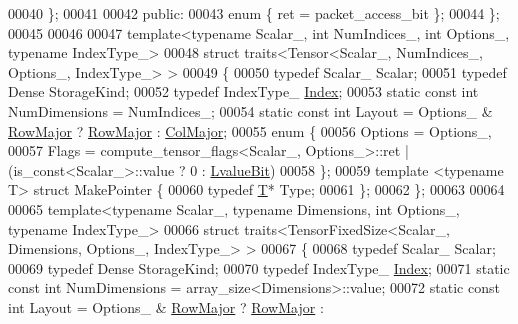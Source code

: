 \begin{DoxyCode}
00040   \};
00041 
00042   \textcolor{keyword}{public}:
00043     \textcolor{keyword}{enum} \{ ret = packet\_access\_bit \};
00044 \};
00045 
00046 
00047 \textcolor{keyword}{template}<\textcolor{keyword}{typename} Scalar\_, \textcolor{keywordtype}{int} NumIndices\_, \textcolor{keywordtype}{int} Options\_, \textcolor{keyword}{typename} IndexType\_>
00048 \textcolor{keyword}{struct }traits<Tensor<Scalar\_, NumIndices\_, Options\_, IndexType\_> >
00049 \{
00050   \textcolor{keyword}{typedef} Scalar\_ Scalar;
00051   \textcolor{keyword}{typedef} Dense StorageKind;
00052   \textcolor{keyword}{typedef} IndexType\_ \hyperlink{namespace_eigen_a62e77e0933482dafde8fe197d9a2cfde}{Index};
00053   \textcolor{keyword}{static} \textcolor{keyword}{const} \textcolor{keywordtype}{int} NumDimensions = NumIndices\_;
00054   \textcolor{keyword}{static} \textcolor{keyword}{const} \textcolor{keywordtype}{int} Layout = Options\_ & \hyperlink{group__enums_ggaacded1a18ae58b0f554751f6cdf9eb13acfcde9cd8677c5f7caf6bd603666aae3}{RowMajor} ? \hyperlink{group__enums_ggaacded1a18ae58b0f554751f6cdf9eb13acfcde9cd8677c5f7caf6bd603666aae3}{RowMajor} : 
      \hyperlink{group__enums_ggaacded1a18ae58b0f554751f6cdf9eb13a0cbd4bdd0abcfc0224c5fcb5e4f6669a}{ColMajor};
00055   \textcolor{keyword}{enum} \{
00056     Options = Options\_,
00057     Flags = compute\_tensor\_flags<Scalar\_, Options\_>::ret | (is\_const<Scalar\_>::value ? 0 : 
      \hyperlink{group__flags_gae2c323957f20dfdc6cb8f44428eaec1a}{LvalueBit})
00058   \};
00059   \textcolor{keyword}{template} <\textcolor{keyword}{typename} T> \textcolor{keyword}{struct }MakePointer \{
00060     \textcolor{keyword}{typedef} \hyperlink{group___sparse_core___module_class_eigen_1_1_triplet}{T}* Type;
00061   \};
00062 \};
00063 
00064 
00065 \textcolor{keyword}{template}<\textcolor{keyword}{typename} Scalar\_, \textcolor{keyword}{typename} Dimensions, \textcolor{keywordtype}{int} Options\_, \textcolor{keyword}{typename} IndexType\_>
00066 \textcolor{keyword}{struct }traits<TensorFixedSize<Scalar\_, Dimensions, Options\_, IndexType\_> >
00067 \{
00068   \textcolor{keyword}{typedef} Scalar\_ Scalar;
00069   \textcolor{keyword}{typedef} Dense StorageKind;
00070   \textcolor{keyword}{typedef} IndexType\_ \hyperlink{namespace_eigen_a62e77e0933482dafde8fe197d9a2cfde}{Index};
00071   \textcolor{keyword}{static} \textcolor{keyword}{const} \textcolor{keywordtype}{int} NumDimensions = array\_size<Dimensions>::value;
00072   \textcolor{keyword}{static} \textcolor{keyword}{const} \textcolor{keywordtype}{int} Layout = Options\_ & \hyperlink{group__enums_ggaacded1a18ae58b0f554751f6cdf9eb13acfcde9cd8677c5f7caf6bd603666aae3}{RowMajor} ? \hyperlink{group__enums_ggaacded1a18ae58b0f554751f6cdf9eb13acfcde9cd8677c5f7caf6bd603666aae3}{RowMajor} : 

\end{DoxyCode}
